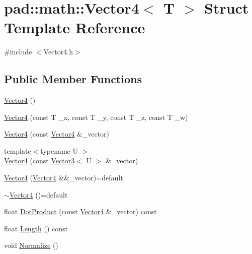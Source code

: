 \hypertarget{structpad_1_1math_1_1_vector4}{}\section{pad\+:\+:math\+:\+:Vector4$<$ T $>$ Struct Template Reference}
\label{structpad_1_1math_1_1_vector4}


{\ttfamily \#include $<$Vector4.\+h$>$}

\subsection*{Public Member Functions}
\begin{DoxyCompactItemize}
\item 
\mbox{\hyperlink{structpad_1_1math_1_1_vector4_a685f645bb73f9e7e2f0cfad10f8c9b3b}{Vector4}} ()
\item 
\mbox{\hyperlink{structpad_1_1math_1_1_vector4_a9ba6589a62f7635c2255c52c7b818aec}{Vector4}} (const T \+\_\+x, const T \+\_\+y, const T \+\_\+z, const T \+\_\+w)
\item 
\mbox{\hyperlink{structpad_1_1math_1_1_vector4_a44585061b6980544187b6309a3371061}{Vector4}} (const \mbox{\hyperlink{structpad_1_1math_1_1_vector4}{Vector4}} \&\+\_\+vector)
\item 
{\footnotesize template$<$typename U $>$ }\\\mbox{\hyperlink{structpad_1_1math_1_1_vector4_a8eff662101e960939085ce8033f9ddae}{Vector4}} (const \mbox{\hyperlink{structpad_1_1math_1_1_vector3}{Vector3}}$<$ U $>$ \&\+\_\+vector)
\item 
\mbox{\hyperlink{structpad_1_1math_1_1_vector4_acc4699e8164a36ac16bac91357f8e7cd}{Vector4}} (\mbox{\hyperlink{structpad_1_1math_1_1_vector4}{Vector4}} \&\&\+\_\+vector)=default
\item 
\mbox{\hyperlink{structpad_1_1math_1_1_vector4_adf02f843943a3524de2add168b4d4903}{$\sim$\+Vector4}} ()=default
\item 
float \mbox{\hyperlink{structpad_1_1math_1_1_vector4_aa2bc23659e5331ea63c4135ff4ba0cc5}{Dot\+Product}} (const \mbox{\hyperlink{structpad_1_1math_1_1_vector4}{Vector4}} \&\+\_\+vector) const
\item 
float \mbox{\hyperlink{structpad_1_1math_1_1_vector4_ac374b52275efc5f8e8b988e347fc340e}{Length}} () const
\item 
void \mbox{\hyperlink{structpad_1_1math_1_1_vector4_ae79f5cf216a4270769bfb88a54d0541d}{Normalize}} ()
\item 

\end{DoxyCompactItemize}
